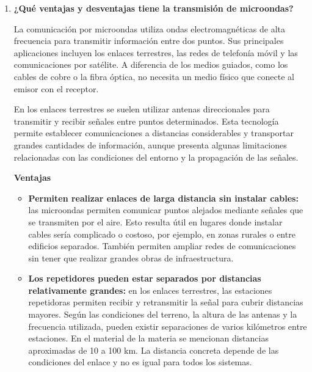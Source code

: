 \documentclass[11pt,a4paper]{article}
\begin{document}
\begin{enumerate}[label=4.\arabic*), itemsep=0.3cm]
        Esto importa ya que Stallings destaca que la atenuación es significativamente menor en las fibras ópticas que en los cables coaxiales y los pares trenzados, y que los sistemas de fibra no se ven afectados por campos electromagnéticos exteriores, por lo que no son vulnerables a interferencias, ruido impulsivo ni diafonía. Por eso la fibra tiene una gran aceptación en las telecomunicaciones a larga distancia y cada vez se usa más en redes de área local. Finalmente, Tanenbaum aclara que las fibras por lo general se agrupan en haces, protegidas por una funda exterior común.
  \item \textbf{¿Qué ventajas y desventajas tiene la transmisión de microondas?}

        La comunicación por microondas utiliza ondas electromagnéticas de alta frecuencia para transmitir información entre dos puntos. Sus principales aplicaciones incluyen los enlaces terrestres, las redes de telefonía móvil y las comunicaciones por satélite. A diferencia de los medios guiados, como los cables de cobre o la fibra óptica, no necesita un medio físico que conecte al emisor con el receptor.

        En los enlaces terrestres se suelen utilizar antenas direccionales para transmitir y recibir señales entre puntos determinados. Esta tecnología permite establecer comunicaciones a distancias considerables y transportar grandes cantidades de información, aunque presenta algunas limitaciones relacionadas con las condiciones del entorno y la propagación de las señales.

        \textbf{Ventajas}
        \begin{itemize}
          \item \textbf{Permiten realizar enlaces de larga distancia sin instalar cables:}
          las microondas permiten comunicar puntos alejados mediante señales que se transmiten por el aire. Esto resulta útil en lugares donde instalar cables sería complicado o costoso, por ejemplo, en zonas rurales o entre edificios separados. También permiten ampliar redes de comunicaciones sin tener que realizar grandes obras de infraestructura.

          \item \textbf{Los repetidores pueden estar separados por distancias relativamente grandes:}
          en los enlaces terrestres, las estaciones repetidoras permiten recibir y retransmitir la señal para cubrir distancias mayores. Según las condiciones del terreno, la altura de las antenas y la frecuencia utilizada, pueden existir separaciones de varios kilómetros entre estaciones. En el material de la materia se mencionan distancias aproximadas de 10 a 100 km. La distancia concreta depende de las condiciones del enlace y no es igual para todos los sistemas.


\end{itemize}
\end{enumerate}
\end{document}
